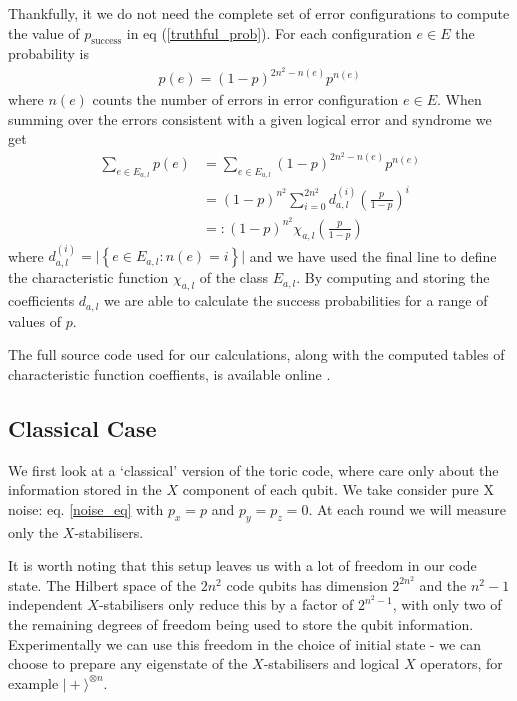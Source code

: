 Thankfully, it we do not need the complete set of error configurations to compute the value of $p_\text{success}$ in eq (\ref{truthful_prob}). For each configuration $e\in E$ the probability is
\begin{align}
  p(e) = (1-p)^{2n^2 - n(e)} p^{n(e)}
\end{align}
where $n(e)$ counts the number of errors in error configuration $e \in E$. When summing over the errors consistent with a given logical error and syndrome we get
\begin{align}
  \sum_{e \in E_{a,l}} p(e) &= \sum_{e \in E_{a,l}} (1-p)^{2n^2 - n(e)} p^{n(e)} \\
  &= (1-p)^{n^2} \sum_{i = 0}^{2n^2} d_{a,l}^{(i)} \left(\frac{p}{1-p}\right)^i \\
  &=: (1-p)^{n^2} \chi_{a,l}\left(\frac{p}{1-p}\right)
\end{align}
where $d_{a,l}^{(i)} = \vert \left\{e \in E_{a,l} : n(e)=i \right\} \vert$ and we have used the final line to define the characteristic function $\chi_{a,l}$ of the class $E_{a,l}$. By computing and storing the coefficients $d_{a,l}$ we are able to calculate the success probabilities for a range of values of $p$.

The full source code used for our calculations, along with the computed tables of characteristic function coeffients, is available online \cite{?}.

\subsection{Classical Case}

We first look at a `classical' version of the toric code, where care only about the information stored in the $X$ component of each qubit. We take consider pure X noise: eq. \ref{noise_eq} with $p_x = p$ and $p_y = p_z = 0$. At each round we will measure only the $X$-stabilisers.

It is worth noting that this setup leaves us with a lot of freedom in our code state. The Hilbert space of the $2n^2$ code qubits has dimension $2^{2n^2}$ and the $n^2-1$ independent $X$-stabilisers only reduce this by a factor of $2^{n^2-1}$, with only two of the remaining degrees of freedom being used to store the qubit information. Experimentally we can use this freedom in the choice of initial state - we can choose to prepare any eigenstate of the $X$-stabilisers and logical $X$ operators, for example $\vert + \rangle^{\otimes n}$.

